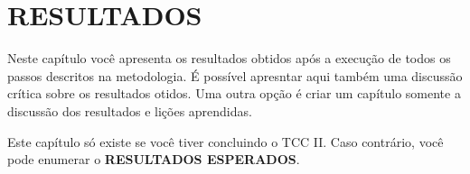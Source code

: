 \newpage
\chapter{RESULTADOS}\label{cap:resultados}


Neste capítulo você apresenta os resultados obtidos após a execução de todos os passos descritos na metodologia. É possível apresntar aqui também uma discussão crítica sobre os resultados otidos.  Uma outra opção é criar um capítulo somente a discussão dos resultados e lições aprendidas.

Este capítulo só existe se você tiver concluindo o TCC II. Caso contrário, você pode enumerar o \textbf{RESULTADOS ESPERADOS}.


